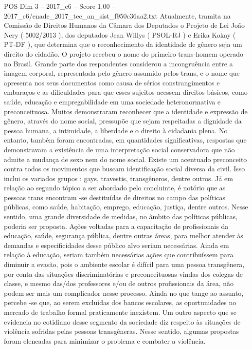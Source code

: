 \begin{textsample}{POS Dim 3 – 2017\_c6 – Score 1.00 – 2017\_c6/enade\_2017\_tec\_an\_sist\_f950c36aa2.txt}
Atualmente, tramita na Comissão de Direitos Humanos da Câmara dos Deputados o Projeto de Lei João Nery ( 5002/2013 ), dos deputados Jean Willys ( PSOL-RJ ) e Erika Kokay ( PT-DF ), que determina que o reconhecimento da identidade de gênero seja um direito do cidadão.
O projeto recebeu o nome do primeiro trans-homem operado no Brasil.
Grande parte dos respondentes considerou a incongruência entre a imagem corporal, representada pelo gênero assumido pelos trans, e o nome que apresenta nos seus documentos como causa de sérios constrangimentos e embaraços e as dificuldades para que esses sujeitos acessem direitos básicos, como saúde, educação e empregabilidade em uma sociedade heteronormativa e preconceituosa.
Muitos demonstraram reconhecer que a identidade e expressão de gênero, através do nome social, pressupõe que sejam respeitadas a dignidade da pessoa humana, a intimidade, a liberdade e o direito à cidadania plena.
No entanto, também foram encontradas, em quantidades significativas, respostas que demonstravam a existência de uma interpretação social conservadora que não admite a mudança de sexo nem do nome social.
Existe um acentuado preconceito contra todos os movimentos que buscam identificação social diversa da civil.
Isso inclui os variados grupos : gays, travestis, transgêneros, dentre outros.
Já em relação ao segundo tópico a ser abordado pelo concluinte, é notório que as pessoas trans encontram -se destituídas de direitos no campo das políticas públicas, como saúde, habitação, emprego, educação, justiça, dentre outros.
Nesse sentido, uma grande diversidade de medidas, no âmbito das políticas públicas, poderia ser proposta.
Ações voltadas para a capacitação de profissionais da educação, saúde, segurança pública, dentre outras áreas, para melhor atender às demandas e especificidades desse público alvo seriam necessárias.
Ainda em relação à educação, seriam também necessárias ações que contribuíssem para diminuir a evasão, pois o ambiente escolar é difícil para uma pessoa transgênera, por conta das situações discriminatórias e preconceituosas vindas dos colegas de classe, e mesmo das/dos professores e/ou de outros profissionais da área, não podem ser mais um complicador nesse processo.
Ainda no que tange ao assunto, percebe -se que, ao serem excluídas dos bancos escolares, as oportunidades no mercado de trabalho formal praticamente inexistem.
Um outro aspecto que se evidencia no cotidiano desse segmento da sociedade diz respeito às situações de violência sofridas pelas pessoas transgêneras.
Nesse sentido, algumas propostas foram elencadas para minimizar o problema e combater a violência.

\end{textsample}
